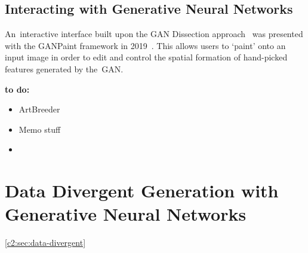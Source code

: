 \subsection{Interacting with Generative Neural Networks} 

An~interactive interface built upon the GAN Dissection approach~\citep{Bau2018-td} was presented with the GANPaint framework in 2019~\citep{bau2019semantic}. 
This allows users to `paint' onto an input image in order to edit and control the spatial formation of hand-picked features generated by the~GAN. 

\textbf{to do:}
\begin{itemize}
    \item ArtBreeder 
    \item Memo stuff 
    \item 
  \end{itemize}


\section{Data Divergent Generation with Generative Neural Networks}

\ref{c2:sec:data-divergent}